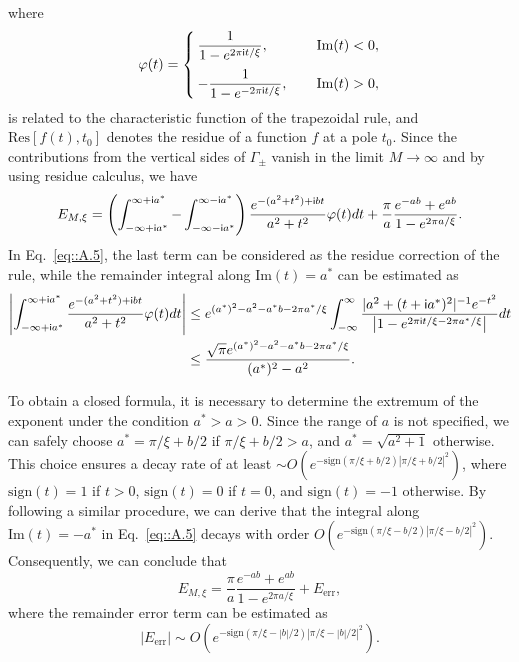 where
\begin{align}
\varphi(t)=\begin{cases}
\dfrac{1}{1-e^{2\pi\mathsf i t/\xi}},\,\quad &\text{Im}(t)<0,\\[1em]
-\dfrac{1}{1-e^{-2\pi\mathsf i t/\xi}},\,\quad&\text{Im}(t)>0,
\end{cases}
\end{align}
is related to the characteristic function of the trapezoidal rule, and $\text{Res}[f(t),t_0]$ denotes the residue of a function $f$ at a pole $t_0$. Since the contributions from the vertical sides of $\Gamma_{\pm}$ vanish in the limit $M\rightarrow \infty$ and by using residue calculus, we have
\begin{equation}\label{eq::A.5}
E_{M,\xi}=\left(\int_{-\infty+\mathsf i a^*}^{\infty+\mathsf i a^*}-\int_{-\infty-\mathsf i a^*}^{\infty-\mathsf i a^*}\right)\frac{e^{-(a^2+t^2)+\mathsf i b t}}{a^2+t^2}\varphi(t)dt+\frac{\pi}{a}\frac{e^{-ab}+e^{ab}}{1-e^{2\pi a/\xi}}.
\end{equation}
In Eq.~\eqref{eq::A.5}, the last term can be considered as the residue correction of the rule, while the remainder integral along $\text{Im}(t)=a^*$ can be estimated as
\begin{equation}
\begin{split}
\left|\int_{-\infty+\mathsf i a^*}^{\infty+\mathsf i a^*}\frac{e^{-(a^2+t^2)+\mathsf i b t}}{a^2+t^2}\varphi(t)dt\right|&\leq e^{(a^*)^2-a^2-a^*b-2\pi a^*/\xi}\int_{-\infty}^{\infty}\frac{|a^2+(t+\mathsf i a^*)^2|^{-1}e^{-t^2}}{\left|1-e^{2\pi\mathsf i t/\xi-2\pi a^*/\xi}\right|}dt\\
&\leq\frac{\sqrt{\pi}e^{(a^*)^2-a^2-a^*b-2\pi a^*/\xi}}{(a^*)^2-a^2}.
\end{split}
\end{equation}

To obtain a closed formula, it is necessary to determine the extremum of the exponent under the condition $a^*>a>0$. Since the range of $a$ is not specified, we can safely choose $a^*=\pi/\xi+b/2$ if $\pi/\xi+b/2>a$, and $a^*=\sqrt{a^2+1}$ otherwise. This choice ensures a decay rate of at least $\sim O(e^{-\text{sign}(\pi/\xi+b/2)|\pi/\xi+b/2|^2})$, where $\text{sign}(t)=1$ if $t> 0$, $\text{sign}(t)=0$ if $t=0$, and $\text{sign}(t)=-1$ otherwise. By following a similar procedure, we can derive that the integral along $\text{Im}(t)=-a^*$ in Eq.~\eqref{eq::A.5} decays with order $O(e^{-\text{sign}(\pi/\xi-b/2)|\pi/\xi-b/2|^2})$. Consequently, we can conclude that
\begin{equation}
E_{M,\xi}=\frac{\pi}{a}\frac{e^{-ab}+e^{ab}}{1-e^{2\pi a/\xi}}+E_{\text{err}},
\end{equation}
where the remainder error term can be estimated as 
\begin{equation}\label{eq::A.8}
|E_{\text{err}}|\sim O(e^{-\text{sign}(\pi/\xi-|b|/2)\left|\pi/\xi-|b|/2\right|^2}).
\end{equation}

